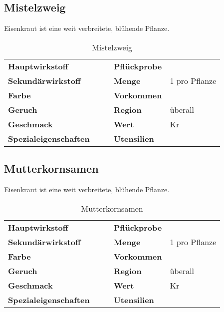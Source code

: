 \subsection{Mistelzweig}
Eisenkraut ist eine weit verbreitete, blühende Pflanze. 

\begin{table}[h]
\begin{center}
\begin{tabular}{|l|l|p{1cm}|l|l|}
	\cline{1-2} \cline{4-5}
	\textbf{Hauptwirkstoff} &  && \textbf{Pflückprobe} &  \\ \cline{1-2} \cline{4-5}
	\textbf{Sekundärwirkstoff} &  && \textbf{Menge} & 1 pro Pflanze \\ \cline{1-2} \cline{4-5}
	\textbf{Farbe} &  && \textbf{Vorkommen} &  \\ \cline{1-2} \cline{4-5}
	\textbf{Geruch} &  && \textbf{Region} & überall \\ \cline{1-2} \cline{4-5}
	\textbf{Geschmack} &  && \textbf{Wert} & Kr \\ \cline{1-2} \cline{4-5}
	\textbf{Spezialeigenschaften} &  && \textbf{Utensilien} &  \\ \cline{1-2} \cline{4-5}
\end{tabular}
\end{center}
\caption{Mistelzweig}
\label{tab:mistelzweig}
\end{table}


\subsection{Mutterkornsamen}
Eisenkraut ist eine weit verbreitete, blühende Pflanze. 

\begin{table}[h]
\begin{center}
\begin{tabular}{|l|l|p{1cm}|l|l|}
	\cline{1-2} \cline{4-5}
	\textbf{Hauptwirkstoff} &  && \textbf{Pflückprobe} &  \\ \cline{1-2} \cline{4-5}
	\textbf{Sekundärwirkstoff} &  && \textbf{Menge} & 1 pro Pflanze \\ \cline{1-2} \cline{4-5}
	\textbf{Farbe} &  && \textbf{Vorkommen} &  \\ \cline{1-2} \cline{4-5}
	\textbf{Geruch} &  && \textbf{Region} & überall \\ \cline{1-2} \cline{4-5}
	\textbf{Geschmack} &  && \textbf{Wert} & Kr \\ \cline{1-2} \cline{4-5}
	\textbf{Spezialeigenschaften} &  && \textbf{Utensilien} &  \\ \cline{1-2} \cline{4-5}
\end{tabular}
\end{center}
\caption{Mutterkornsamen}
\label{tab:mutterkornsamen}
\end{table}


